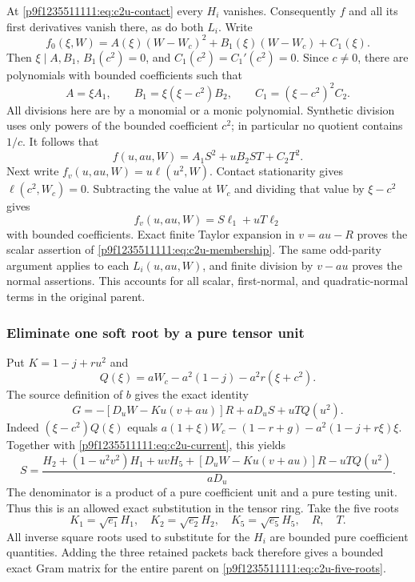 At \eqref{p9f1235511111:eq:c2u-contact} every $H_i$ vanishes. Consequently $f$ and
all its first derivatives vanish there, as do both $L_i$. Write
\[
 f_0(\xi,W)=A(\xi)(W-W_c)^2+B_1(\xi)(W-W_c)+C_1(\xi).
\]
Then $\xi\mid A,B_1$, $B_1(c^2)=0$, and
$C_1(c^2)=C_1'(c^2)=0$. Since $c\ne0$, there are polynomials with
bounded coefficients such that
\[
 A=\xi A_1,\qquad B_1=\xi(\xi-c^2)B_2,\qquad
 C_1=(\xi-c^2)^2C_2.
\]
All divisions here are by a monomial or a monic polynomial.
Synthetic division uses only powers of the bounded coefficient $c^2$;
in particular no quotient contains $1/c$. It follows that
\[
 f(u,au,W)=A_1S^2+uB_2ST+C_2T^2.
\]
Next write $f_v(u,au,W)=u\ell(u^2,W)$. Contact stationarity gives
$\ell(c^2,W_c)=0$. Subtracting the value at $W_c$ and dividing that
value by $\xi-c^2$ gives
\[
 f_v(u,au,W)=S\ell_1+uT\ell_2
\]
with bounded coefficients. Exact finite Taylor expansion in $v=au-R$
proves the scalar assertion of \eqref{p9f1235511111:eq:c2u-membership}. The same
odd-parity argument applies to each $L_i(u,au,W)$, and finite division
by $v-au$ proves the normal assertions. This accounts for all scalar,
first-normal, and quadratic-normal terms in the original parent.

\subsubsection*{Eliminate one soft root by a pure tensor unit}
Put $K=1-j+ru^2$ and
\[
Q(\xi)=aW_c-a^2(1-j)-a^2r(\xi+c^2).
\]
The source definition of $b$ gives the exact identity
\begin{equation}
G=-[D_uW-Ku(v+au)]R+aD_uS+uTQ(u^2).
\label{p9f1235511111:eq:c2u-current-soft}
\end{equation}
Indeed $(\xi-c^2)Q(\xi)$ equals
$a(1+\xi)W_c-(1-r+g)-a^2(1-j+r\xi)\xi$.
Together with \eqref{p9f1235511111:eq:c2u-current}, this yields
\begin{equation}
S=\frac{H_2+(1-u^2v^2)H_1+uvH_5
 +[D_uW-Ku(v+au)]R-uTQ(u^2)}{aD_u}.
\label{p9f1235511111:eq:c2u-eliminate-S}
\end{equation}
The denominator is a product of a pure coefficient unit and a pure
testing unit.  Thus this is an allowed exact substitution in the tensor
ring.  Take the five roots
\begin{equation}
K_1=\sqrt{e_1}H_1,\quad K_2=\sqrt{e_2}H_2,\quad
K_5=\sqrt{e_5}H_5,\quad R,\quad T.
\label{p9f1235511111:eq:c2u-five-roots}
\end{equation}
All inverse square roots used to substitute for the $H_i$ are bounded
pure coefficient quantities.  Adding the three retained packets back
therefore gives a bounded exact Gram matrix for the entire parent on
\eqref{p9f1235511111:eq:c2u-five-roots}.

